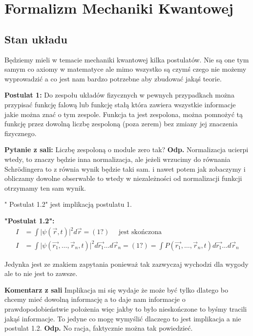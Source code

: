 \section{Formalizm Mechaniki Kwantowej}
\subsection{Stan układu}
Będziemy mieli w temacie mechaniki kwantowej kilka postulatów. Nie są one tym samym co axiomy w matematyce ale mimo wszystko są czymś czego nie możemy wyprowadzić a co jest nam bardzo potrzebne aby zbudować jakąś teorie.

\textbf{Postulat 1:} Do zespołu układów fizycznych w pewnych przypadkach można przypisać funkcję falową lub funkcję stałą która zawiera wszystkie informacje jakie można znać o tym zespole. Funkcja ta jest zespolona, można pomnożyć tą funkcję przez dowolną liczbę zespoloną (poza zerem) bez zmiany jej znaczenia fizycznego.

\textbf{Pytanie z sali:} Liczbę zespoloną o module zero tak? \textbf{Odp.} Normalizacja ucierpi wtedy, to znaczy będzie inna normalizacja, ale jeżeli wrzucimy do równania Schrödingera to z równia wynik będzie taki sam. i nawet potem jak zobaczymy i obliczamy dowolne obserwable to wtedy w niezależności od normalizacji funkcji otrzymamy ten sam wynik.

" Postulat 1.2" \hspace{1pt} jest implikacją postulatu 1.

\textbf{"Postulat 1.2":}
\begin{equation*}
	\begin{split}
		I &= \int \vert \psi(\vec{r}, t)\vert^2 d\vec{r} = (1?) \quad \text{ jest skończona} \\
		I &= \int \vert \psi (\vec{r_1}, \dots, \vec{r}_n, t)\vert^2 d\vec{r_1}\dots d\vec{r}_n = (1?) = \int P(\vec{r_1}, \dots, \vec{r}_n, t)d\vec{r_1}\dots d\vec{r}_n
	\end{split}
\end{equation*}

Jedynka jest ze znakiem zapytania ponieważ tak zazwyczaj wychodzi dla wygody ale to nie jest to zawsze.

\textbf{Komentarz z sali} Implikacja mi się wydaje że może być tylko dlatego bo chcemy mieć dowolną informację a to daje nam informacje o prawdopodobieństwie położenia więc jakby to było nieskończone to byśmy tracili jakąś informacje. To jedyne co mogę wymyślić dlaczego to jest implikacja a nie postulat 1.2. \textbf{Odp.} No racja, faktycznie można tak powiedzieć.

